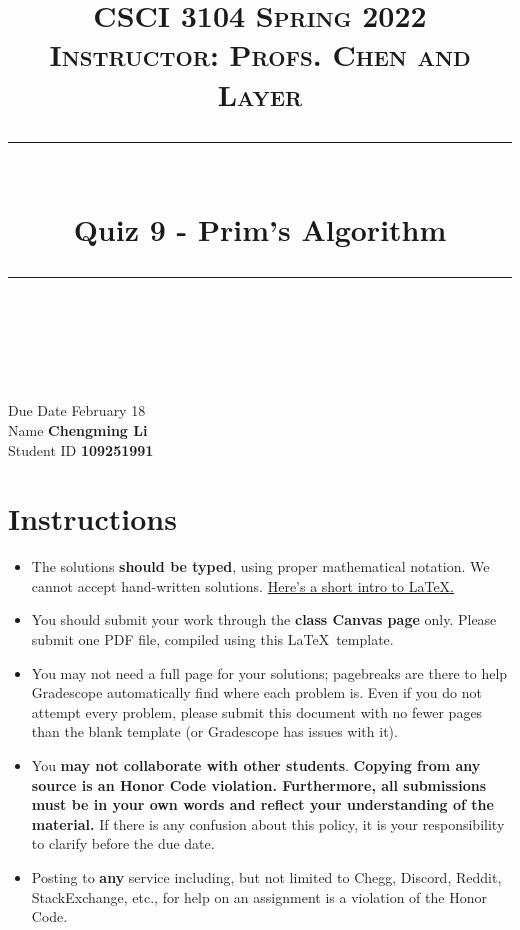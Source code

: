 \documentclass[11pt]{article}
\title{
\normalfont \normalsize 
\textsc{CSCI 3104 Spring 2022\\
Instructor: Profs. Chen and Layer} \\
[10pt] 
\rule{\linewidth}{0.5pt} \\[6pt] 
\huge Quiz 9 - Prim's Algorithm \\
\rule{\linewidth}{2pt}  \\[10pt]
}
\date{}
\theoremstyle{definition}
\theoremstyle{definition}
\theoremstyle{definition}
\begin{document}
\maketitle


\noindent
Due Date \dotfill February 18 \\
Name \dotfill \textbf{Chengming Li} \\
Student ID \dotfill \textbf{109251991} \\


\tableofcontents

\section{Instructions}
 \begin{itemize}
	\item The solutions \textbf{should be typed}, using proper mathematical notation. We cannot accept hand-written solutions. \href{http://ece.uprm.edu/~caceros/latex/introduction.pdf}{Here's a short intro to \LaTeX.}
	\item You should submit your work through the \textbf{class Canvas page} only. Please submit one PDF file, compiled using this \LaTeX \ template.
	\item You may not need a full page for your solutions; pagebreaks are there to help Gradescope automatically find where each problem is. Even if you do not attempt every problem, please submit this document with no fewer pages than the blank template (or Gradescope has issues with it).

	\item You \textbf{may not collaborate with other students}. \textbf{Copying from any source is an Honor Code violation. Furthermore, all submissions must be in your own words and reflect your understanding of the material.} If there is any confusion about this policy, it is your responsibility to clarify before the due date. 

	\item Posting to \textbf{any} service including, but not limited to Chegg, Discord, Reddit, StackExchange, etc., for help on an assignment is a violation of the Honor Code.
\end{itemize}
\end{document}
